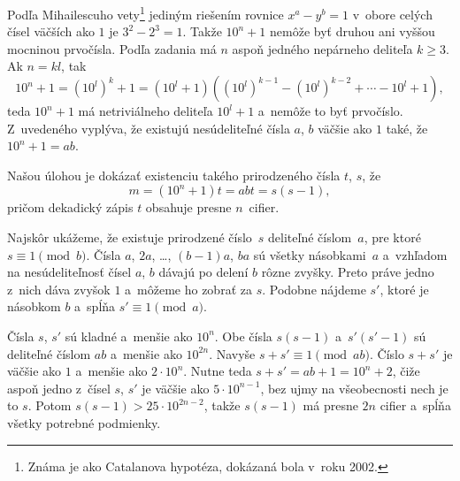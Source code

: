 {%
Podľa Mihailescuho vety\footnote{Známa je ako Catalanova hypotéza, dokázaná bola v~roku 2002.} jediným riešením rovnice $x^a-y^b=1$ v~obore celých čísel väčších ako $1$ je $3^2-2^3=1$. Takže $10^n+1$ nemôže byť druhou ani vyššou mocninou prvočísla. Podľa zadania má $n$ aspoň jedného nepárneho deliteľa $k\ge3$. Ak $n=kl$, tak
$$
10^n+1=(10^l)^k+1=(10^l+1)\left((10^l)^{k-1}-(10^l)^{k-2}+\cdots-10^l+1\right),
$$
teda $10^n+1$ má netriviálneho deliteľa $10^l+1$ a~nemôže to byť prvočíslo. Z~uvedeného vyplýva, že existujú nesúdeliteľné čísla $a$, $b$ väčšie ako $1$ také, že $10^n+1=ab$.

Našou úlohou je dokázať existenciu takého prirodzeného čísla $t$, $s$, že
$$
m = (10^n + 1) t = abt = s(s-1),
$$
pričom dekadický zápis $t$ obsahuje presne $n$~cifier.

Najskôr ukážeme, že existuje prirodzené číslo~$s$ deliteľné číslom~$a$, pre ktoré $s\equiv 1\pmod b$.
Čísla $a$, $2a$, \dots, $(b-1)a$, $ba$ sú všetky násobkami~$a$ a~vzhľadom na nesúdeliteľnosť čísel $a$, $b$ dávajú po delení $b$ rôzne zvyšky. Preto práve jedno z~nich dáva zvyšok $1$ a~môžeme ho zobrať za $s$. Podobne nájdeme $s'$, ktoré je násobkom $b$ a~spĺňa $s'\equiv 1\pmod a$.

Čísla $s$, $s'$ sú kladné a~menšie ako $10^n$. Obe čísla $s(s-1)$ a~$s'(s'-1)$ sú deliteľné číslom $ab$ a~menšie ako $10^{2n}$.
Navyše $s+s'\equiv 1\pmod{ab}$. Číslo $s+s'$ je väčšie ako $1$ a~menšie ako $2\cdot 10^n$. Nutne teda $s+s' = ab+1=10^n+2$, čiže aspoň jedno z~čísel $s$, $s'$ je väčšie ako $5\cdot 10^{n-1}$, bez ujmy na všeobecnosti nech je to $s$. Potom $s(s-1)>25\cdot 10^{2n-2}$, takže $s(s-1)$ má presne $2n$ cifier a~spĺňa všetky potrebné podmienky.
}
